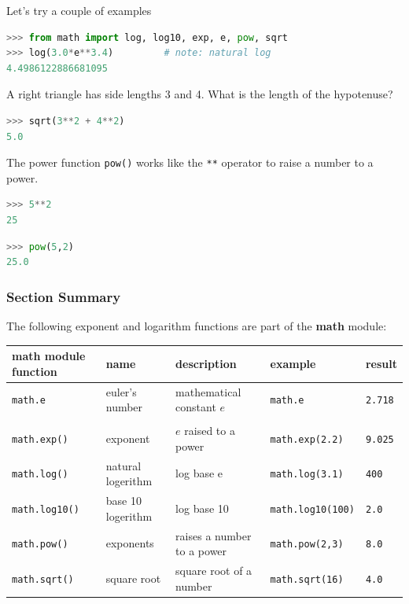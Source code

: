 \documentclass{book}
\begin{document}
Let's try a couple of examples

\begin{lstlisting}[language=Python]
>>> from math import log, log10, exp, e, pow, sqrt
>>> log(3.0*e**3.4)         # note: natural log
4.4986122886681095
\end{lstlisting}

A right triangle has side lengths 3 and 4. What is the length of the
hypotenuse?

\begin{lstlisting}[language=Python]
>>> sqrt(3**2 + 4**2)
5.0 
\end{lstlisting}

The power function \lstinline!pow()! works like the \lstinline!**!
operator to raise a number to a power.

\begin{lstlisting}[language=Python]
>>> 5**2
25
\end{lstlisting}

\begin{lstlisting}[language=Python]
>>> pow(5,2)
25.0
\end{lstlisting}

\subsubsection{Section Summary}\label{section-summary}

The following exponent and logarithm functions are part of the
\textbf{math} module:

\begin{longtable}[]{@{}lllll@{}}
\toprule
math module function & name & description & example &
result\tabularnewline
\midrule
\endhead
\lstinline!math.e! & euler's number & mathematical constant \(e\) &
\lstinline!math.e! & \lstinline!2.718!\tabularnewline
& & & &\tabularnewline
\lstinline!math.exp()! & exponent & \(e\) raised to a power &
\lstinline!math.exp(2.2)! & \lstinline!9.025!\tabularnewline
\lstinline!math.log()! & natural logerithm & log base e &
\lstinline!math.log(3.1)! & \lstinline!400!\tabularnewline
\lstinline!math.log10()! & base 10 logerithm & log base 10 &
\lstinline!math.log10(100)! & \lstinline!2.0!\tabularnewline
\lstinline!math.pow()! & exponents & raises a number to a power &
\lstinline!math.pow(2,3)! & \lstinline!8.0!\tabularnewline
\lstinline!math.sqrt()! & square root & square root of a number &
\lstinline!math.sqrt(16)! & \lstinline!4.0!\tabularnewline
\bottomrule
\end{longtable}
\end{document}
